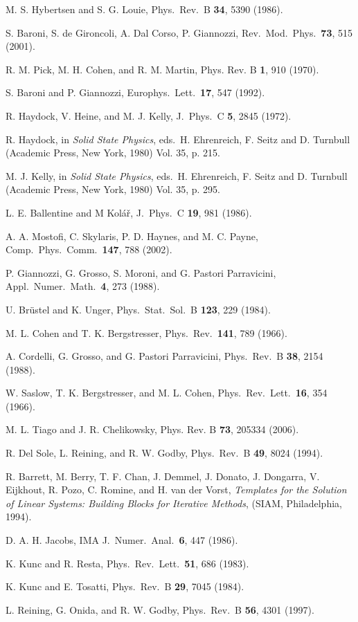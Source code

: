\documentclass[12pt]{article}
\begin{document}
\begin{thebibliography}{99}

M. S. Hybertsen and S. G. Louie,
Phys.\ Rev.\ B {\bf 34}, 5390 (1986).

S. Baroni, S. de Gironcoli, A. Dal Corso, P. Giannozzi,
Rev.\ Mod.\ Phys.\ {\bf 73}, 515 (2001).

R. M. Pick, M. H. Cohen, and R. M. Martin,
Phys. Rev. B {\bf 1}, 910 (1970).

S. Baroni and P. Giannozzi,
Europhys.\ Lett.\ {\bf 17}, 547 (1992).

R. Haydock, V. Heine, and M. J. Kelly,
J.\ Phys.\ C {\bf 5}, 2845 (1972).

R. Haydock, in {\it Solid State Physics}, eds.\ H. Ehrenreich, F. Seitz and D. Turnbull 
(Academic Press, New York, 1980) Vol. 35, p. 215.

M. J. Kelly, in {\it Solid State Physics}, eds.\ H. Ehrenreich, F. Seitz and D. Turnbull 
(Academic Press, New York, 1980) Vol. 35, p. 295.

L. E. Ballentine and M Kol\'a\v r,
J.\ Phys.\ C {\bf 19}, 981 (1986).

A. A. Mostofi, C. Skylaris, P. D. Haynes, and M. C. Payne,
Comp.\ Phys.\ Comm.\ {\bf 147}, 788 (2002).

P. Giannozzi, G. Grosso, S. Moroni, and G. Pastori Parravicini,
Appl.\ Numer.\ Math.\ {\bf 4}, 273 (1988).

U. Br\"ustel and K. Unger,
Phys.\ Stat.\ Sol.\ B {\bf 123}, 229 (1984).

M. L. Cohen and T. K. Bergstresser,
Phys.\ Rev.\ {\bf 141}, 789 (1966).

A. Cordelli, G. Grosso, and G. Pastori Parravicini,
Phys.\ Rev.\ B {\bf 38}, 2154 (1988).

W. Saslow, T. K. Bergstresser, and M. L. Cohen,
Phys.\ Rev.\ Lett.\ {\bf 16}, 354 (1966).

M. L. Tiago and J. R. Chelikowsky,
Phys. Rev. B {\bf 73}, 205334 (2006).

R. Del Sole, L. Reining, and R. W. Godby,
Phys.\ Rev.\ B {\bf 49}, 8024 (1994).

R. Barrett, M. Berry, T. F. Chan, J. Demmel, J. Donato, J. Dongarra, 
V. Eijkhout, R. Pozo, C. Romine, and H. van der Vorst, 
{\it Templates for the Solution of Linear Systems: 
Building Blocks for Iterative Methods}, (SIAM, Philadelphia, 1994). 

D. A. H. Jacobs, 
IMA J.\ Numer.\ Anal.\ {\bf 6}, 447 (1986).

K. Kunc and R. Resta, 
Phys.\ Rev.\ Lett.\ {\bf 51}, 686 (1983).

K. Kunc and E. Tosatti, 
Phys.\ Rev.\ B {\bf 29}, 7045 (1984).

L. Reining, G. Onida, and R. W. Godby, 
Phys.\ Rev.\ B {\bf 56}, 4301 (1997). 

\end{thebibliography}
\end{document}
